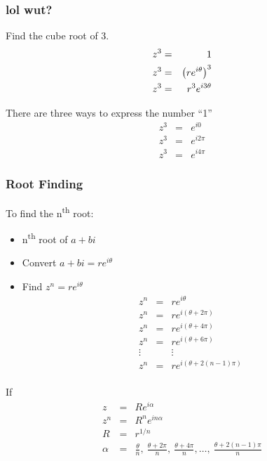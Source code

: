 \begin{frame}
  \frametitle{lol wut?}

  Find the cube root of 3.
  \begin{eqnarray*}
    z^3 & = & 1 \\
    z^3 & = & \left( r e^{i\theta} \right)^3 \\
    z^3 & = & r^3 e^{i3\theta}
  \end{eqnarray*}

  There are three ways to express the number ``1''
  \begin{eqnarray*}
    z^3 & = & e^{i0} \\
    z^3 & = & e^{i2\pi} \\
    z^3 & = & e^{i4\pi}
  \end{eqnarray*}
  
\end{frame}

\begin{frame}
  \frametitle{Root Finding}
  To find the n\textsuperscript{th} root:
  \begin{itemize}
  \item n\textsuperscript{th} root of $a+bi$
  \item Convert $a+bi=re^{i\theta}$ 
  \item Find $z^n=re^{i\theta}$
    \begin{eqnarray*}
      z^n & = & re^{i\theta} \\
      z^n & = & re^{i(\theta+2\pi)} \\
      z^n & = & re^{i(\theta+4\pi)} \\
      z^n & = & re^{i(\theta+6\pi)} \\
      \vdots & & \vdots \\
      z^n & = & re^{i(\theta+2(n-1)\pi)} \\
    \end{eqnarray*}
  \end{itemize}
\end{frame}

\begin{frame}
  If 
  \begin{eqnarray*}
    z & = & R e^{i\alpha} \\
    z^n & = & R^n e^{i n\alpha} \\
    R & = & r^{1/n} \\
    \alpha & = & \frac{\theta}{n}, ~ \frac{\theta+2\pi}{n}, ~
    \frac{\theta+4\pi}{n}, \ldots, ~ \frac{\theta+2(n-1)\pi}{n}
  \end{eqnarray*}
\end{frame}


